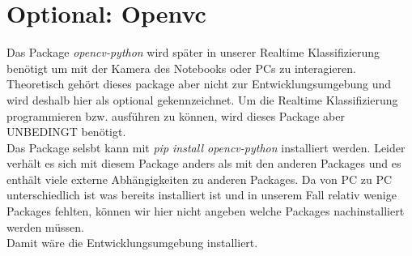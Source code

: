 \section{Optional: Openvc}
Das Package \emph{opencv-python} wird später in unserer Realtime Klassifizierung benötigt um mit der Kamera des Notebooks oder PCs zu interagieren. Theoretisch gehört dieses package aber nicht zur Entwicklungsumgebung und wird deshalb hier als optional gekennzeichnet. Um die Realtime Klassifizierung programmieren bzw. ausführen zu können, wird dieses Package aber UNBEDINGT benötigt.\\
Das Package selsbt kann mit \emph{pip install opencv-python} installiert werden. Leider verhält es sich mit diesem Package anders als mit den anderen Packages und es enthält viele externe Abhängigkeiten zu anderen Packages. Da von PC zu PC unterschiedlich ist was bereits installiert ist und in unserem Fall relativ wenige Packages fehlten, können wir hier nicht angeben welche Packages nachinstalliert werden müssen. \\
Damit wäre die Entwicklungsumgebung installiert.
\label{cha:Installation}